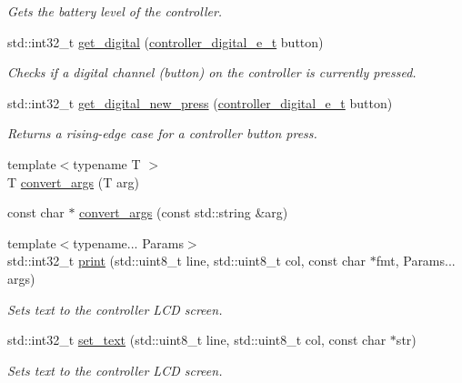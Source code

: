 \begin{DoxyCompactItemize}
\begin{DoxyCompactList}\small\item\em Gets the battery level of the controller. \end{DoxyCompactList}\item 
std\+::int32\+\_\+t \mbox{\hyperlink{classpros_1_1Controller_aec180b0f1700915007de2b7855070c80}{get\+\_\+digital}} (\mbox{\hyperlink{misc_8h_a8c380ff02828ee53954bc0ce274253ed}{controller\+\_\+digital\+\_\+e\+\_\+t}} button)
\begin{DoxyCompactList}\small\item\em Checks if a digital channel (button) on the controller is currently pressed. \end{DoxyCompactList}\item 
std\+::int32\+\_\+t \mbox{\hyperlink{classpros_1_1Controller_a9dc7dc6028431d3f8f9aff0fc7a4bed6}{get\+\_\+digital\+\_\+new\+\_\+press}} (\mbox{\hyperlink{misc_8h_a8c380ff02828ee53954bc0ce274253ed}{controller\+\_\+digital\+\_\+e\+\_\+t}} button)
\begin{DoxyCompactList}\small\item\em Returns a rising-\/edge case for a controller button press. \end{DoxyCompactList}\item 
{\footnotesize template$<$typename T $>$ }\\T \mbox{\hyperlink{classpros_1_1Controller_ae0a289e9e55e8f861591af1a6407a0f8}{convert\+\_\+args}} (T arg)
\item 
const char $\ast$ \mbox{\hyperlink{classpros_1_1Controller_a80ab1bf077cfe15fa9b7c4cba27428ef}{convert\+\_\+args}} (const std\+::string \&arg)
\item 
{\footnotesize template$<$typename... Params$>$ }\\std\+::int32\+\_\+t \mbox{\hyperlink{classpros_1_1Controller_a4a301df3d34578661271f9b400da1176}{print}} (std\+::uint8\+\_\+t line, std\+::uint8\+\_\+t col, const char $\ast$fmt, Params... args)
\begin{DoxyCompactList}\small\item\em Sets text to the controller L\+CD screen. \end{DoxyCompactList}\item 
std\+::int32\+\_\+t \mbox{\hyperlink{classpros_1_1Controller_a2ec84a072d09a4bb39253956662604cd}{set\+\_\+text}} (std\+::uint8\+\_\+t line, std\+::uint8\+\_\+t col, const char $\ast$str)
\begin{DoxyCompactList}\small\item\em Sets text to the controller L\+CD screen. \end{DoxyCompactList}\item 

\end{DoxyCompactItemize}
